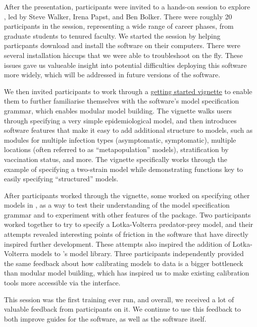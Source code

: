 After the presentation, participants were invited to a hands-on session to explore \macpan, led by Steve Walker, Irena Papst, and Ben Bolker. There were roughly 20 participants in the session, representing a wide range of career phases, from graduate students to tenured faculty. We started the session by helping particpants download and install the software on their computers. There were several installation hiccups that we were able to troubleshoot on the fly. These issues gave us valueable insight into potential difficulties deploying this software more widely, which will be addressed in future versions of the software.

We then invited participants to work through a \href{https://github.com/canmod/macpan2/blob/refactorcpp/vignettes/quickstart.Rmd}{getting started vignette} to enable them to further familiarise themselves with the software's model specification grammar, which enables modular model building. The vignette walks users through specifying a very simple epidemiological model, and then introduces software features that make it easy to add additional structure to models, such as modules for multiple infection types (\eg asymptomatic, symptomatic), multiple locations (often referred to as ``metapopulation'' models), stratification by vaccination status, and more. The vignette specifically works through the example of specifying a two-strain model while demonstrating \macpan functions key to easily specifying ``structured'' models.

After participants worked through the vignette, some worked on specifying other models in \macpan, as a way to test their understanding of the model specification grammar and to experiment with other features of the package. Two participants worked together to try to specify a Lotka-Volterra predator-prey model, and their attempts revealed interesting points of friction in the software that have directly inspired further development. These attempts also inspired the addition of Lotka-Volterra models to \macpan's model library. Three participants independently provided the same feedback about how calibrating models to data is a bigger bottleneck than modular model building, which has inspired us to make existing calibration tools more accessible via the \macpan interface.

This session was the first \macpan training ever run, and overall, we received a lot of valuable feedback from participants on it. We continue to use this feedback to both improve guides for the software, as well as the software itself.